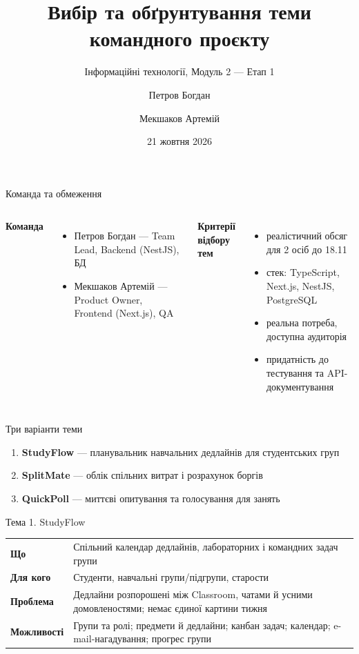 \documentclass[aspectratio=169,11pt]{beamer}
\title{Вибір та обґрунтування теми командного проєкту}
\subtitle{Інформаційні технології, Модуль 2 — Етап 1}
\author{Петров Богдан \and Мекшаков Артемій}
\institute{Група МІ-41}
\date{21 жовтня 2026}
\begin{document}
\maketitle

\begin{frame}{Команда та обмеження}
\begin{columns}[T]
\textbf{Команда}
\begin{itemize}
  \item Петров Богдан — Team Lead, Backend (NestJS), БД
  \item Мекшаков Артемій — Product Owner, Frontend (Next.js), QA
\end{itemize}
\textbf{Критерії відбору тем}
\begin{itemize}
  \item реалістичний обсяг для 2 осіб до 18.11
  \item стек: TypeScript, Next.js, NestJS, PostgreSQL
  \item реальна потреба, доступна аудиторія
  \item придатність до тестування та API-документування
\end{itemize}
\end{columns}
\end{frame}

\begin{frame}{Три варіанти теми}
\begin{enumerate}
  \item \textbf{StudyFlow} — планувальник навчальних дедлайнів для студентських груп
  \item \textbf{SplitMate} — облік спільних витрат і розрахунок боргів
  \item \textbf{QuickPoll} — миттєві опитування та голосування для занять
\end{enumerate}
\end{frame}

\begin{frame}{Тема 1. StudyFlow}
\small
\begin{tabularx}{\textwidth}{>{\bfseries}p{3cm} Y}
Що & Спільний календар дедлайнів, лабораторних і командних задач групи\\[3pt]
Для кого & Студенти, навчальні групи/підгрупи, старости\\[3pt]
Проблема & Дедлайни розпорошені між Classroom, чатами й усними домовленостями; немає єдиної картини тижня\\[3pt]
Можливості & Групи та ролі; предмети й дедлайни; канбан задач; календар; e-mail-нагадування; прогрес групи\\
\end{tabularx}
\end{frame}
\end{document}
